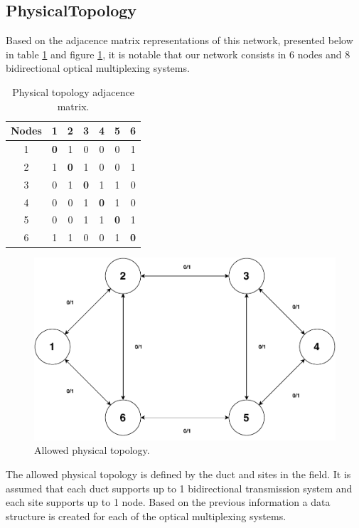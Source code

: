 \subsection{PhysicalTopology}
Based on the adjacence matrix representations of this network, presented below in table \ref{Adjacence_Matrix} and figure \ref{allowed_physical_surv_transp}, it is notable that our network consists in 6 nodes and 8 bidirectional optical multiplexing systems.
\begin{table}[H]
	\centering
	\begin{tabular}{|c|c|c|c|c|c|c|}
		\hline
		\textbf{Nodes} & 1 & 2 & 3 & 4 & 5 & 6 \\ \hline
		1     & \textbf{0} & 1 & 0 & 0 & 0 & 1 \\ \hline
		2     & 1 & \textbf{0} & 1 & 0 & 0 & 1 \\ \hline
		3     & 0 & 1 & \textbf{0} & 1 & 1 & 0 \\ \hline
		4     & 0 & 0 & 1 & \textbf{0} & 1 & 0 \\ \hline
		5     & 0 & 0 & 1 & 1 & \textbf{0} & 1 \\ \hline
		6     & 1 & 1 & 0 & 0 & 1 & \textbf{0} \\ \hline
	\end{tabular}
	\caption{Physical topology adjacence matrix.}
	\label{Adjacence_Matrix}
\end{table}

\begin{figure}[H]
	\centering
	\includegraphics[width=12cm]{sdf/heuristic/transparent/figures/physicalTopology}
	\caption{Allowed physical topology.}
	\label{allowed_physical_surv_transp}
\end{figure}

The allowed physical topology is defined by the duct and sites in the field. It is assumed that each duct supports up to 1 bidirectional transmission system and each site supports up to 1 node. Based on the previous information a data structure is created for each of the optical multiplexing systems.

